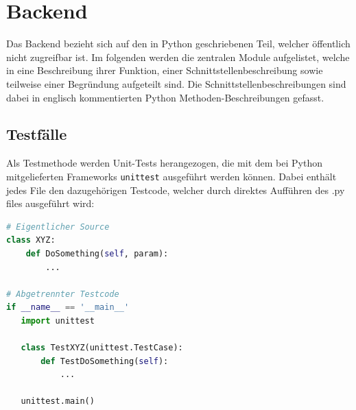 \chapter{Backend}
\label{cha:backend}
Das Backend bezieht sich auf den in Python geschriebenen Teil, welcher
öffentlich nicht zugreifbar ist.
Im folgenden werden die zentralen Module aufgelistet, welche in eine
Beschreibung ihrer Funktion, einer Schnittstellenbeschreibung sowie
teilweise einer Begründung aufgeteilt sind.
Die Schnittstellenbeschreibungen sind dabei in englisch kommentierten Python Methoden-Beschreibungen gefasst. 

\section{Testfälle}
Als Testmethode werden Unit-Tests herangezogen, die mit dem bei Python mitgelieferten Frameworks \texttt{unittest}
ausgeführt werden können. Dabei enthält jedes File den dazugehörigen Testcode, welcher durch direktes Aufführen des
.py files ausgeführt wird:

\begin{lstlisting}[language=Python]
# Eigentlicher Source
class XYZ:
    def DoSomething(self, param):
        ...

# Abgetrennter Testcode
if __name__ == '__main__'
   import unittest

   class TestXYZ(unittest.TestCase):
       def TestDoSomething(self):
           ...

   unittest.main()
\end{lstlisting}

\newpage

